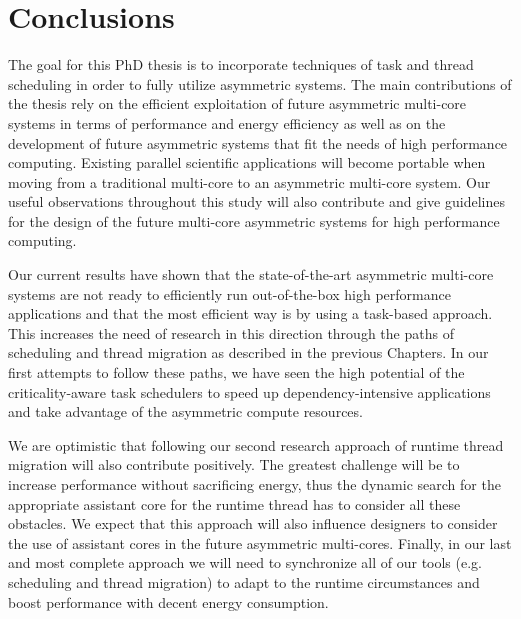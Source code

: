 \chapter{Conclusions}

The goal for this PhD thesis is to incorporate techniques of task and thread scheduling in order to fully utilize asymmetric systems.
The main contributions of the thesis rely on the efficient exploitation of future asymmetric multi-core systems in terms of performance and energy efficiency as well as on the development of future asymmetric systems that fit the needs of high performance computing.
Existing parallel scientific applications will become portable when moving from a traditional multi-core to an asymmetric multi-core system. 
Our useful observations throughout this study will also contribute and give guidelines for the design of the future multi-core asymmetric systems for high performance computing.



Our current results have shown that the state-of-the-art asymmetric multi-core systems are not ready to efficiently run out-of-the-box high performance applications and that the most efficient way is by using a task-based approach.
This increases the need of research in this direction through the paths of scheduling and thread migration as described in the previous Chapters.
In our first attempts to follow these paths, we have seen the high potential of the criticality-aware task schedulers to speed up dependency-intensive applications and take advantage of the asymmetric compute resources.

We are optimistic that following our second research approach of runtime thread migration will also contribute positively.
The greatest challenge will be to increase performance without sacrificing energy, thus the dynamic search for the appropriate assistant core for the runtime thread has to consider all these obstacles.
We expect that this approach will also influence designers to consider the use of assistant cores in the future asymmetric multi-cores.
Finally, in our last and most complete approach we will need to synchronize all of our tools (e.g. scheduling and thread migration) to adapt to the runtime circumstances and boost performance with decent energy consumption.

